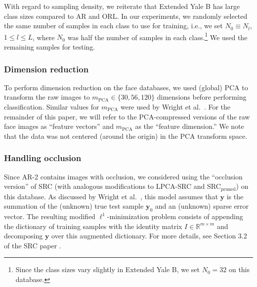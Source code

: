 \documentclass[review]{elsarticle}
\newcommand{\transp}{\mathsf{T}}
\begin{document}
With regard to sampling density, we reiterate that Extended Yale B has large class sizes compared to AR and ORL. In our experiments, we randomly selected the same number of samples in each class to use for training, i.e., we set $N_0 \equiv N_l$, $1\leq l \leq L$, where $N_0$ was half the number of samples in each class.\footnote{Since the class sizes vary slightly in Extended Yale B, we set $N_0 = 32$ on this database.} We used the remaining samples for testing.


\subsubsection{Dimension reduction}
 
To perform dimension reduction on the face databases, we used (global) PCA to transform the raw images to $m_{\mathrm{PCA}} \in \{30, 56,120\}$ dimensions before performing classification. Similar values for $m_{\mathrm{PCA}}$ were used by Wright et al.\ \cite{wri:src}. For the remainder of this paper, we will refer to the PCA-compressed versions of the raw face images as ``feature vectors'' and $m_\mathrm{PCA}$ as the ``feature dimension.'' We note that the data was not centered (around the origin) in the PCA transform space.



\subsubsection{Handling occlusion} 

Since AR-2 contains images with occlusion, we considered using the ``occlusion version'' of SRC (with analogous modifications to LPCA-SRC and SRC$_\mathrm{pruned}$) on this database. As discussed by Wright et al.\ \cite{wri:src}, this model assumes that $\bm{y}$ is the summation of the (unknown) true test sample $\bm{y}_0$ and an (unknown) sparse error vector. The resulting modified $\ell^1$-minimization problem consists of appending the dictionary of training samples with the identity matrix $I \in \mathbb{R}^{m\times m}$ and decomposing $\bm{y}$ over this augmented dictionary. For more details, see Section 3.2 of the SRC paper \cite{wri:src}.

\end{document}
